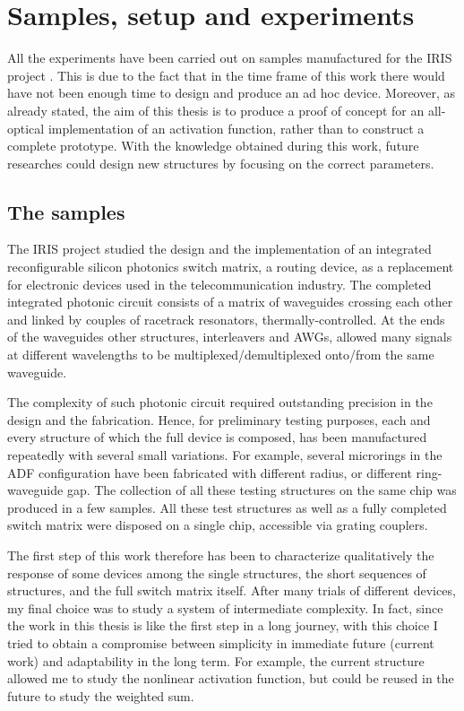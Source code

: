 \chapter{Samples, setup and experiments}
\label{ch:experiments}

All the experiments have been carried out on samples manufactured for the IRIS project \cite{testa2016design}.
This is due to the fact that in the time frame of this work there would have not been enough time to design and produce an ad hoc device.
Moreover, as already stated, the aim of this thesis is to produce a proof of concept for an all-optical implementation of an activation function, rather than to construct a complete prototype.
With the knowledge obtained during this work, future researches could design new structures by focusing on the correct parameters.

\section{The samples}
The IRIS project studied the design and the implementation of an integrated reconfigurable silicon photonics switch matrix, a routing device, as a replacement for electronic devices used in the telecommunication industry.
The completed integrated photonic circuit consists of a matrix of waveguides crossing each other and linked by couples of racetrack resonators, thermally-controlled.
At the ends of the waveguides other structures, interleavers and \acsp{AWG}, allowed many signals at different wavelengths to be multiplexed/demultiplexed onto/from the same waveguide.

The complexity of such photonic circuit required outstanding precision in the design and the fabrication.
Hence, for preliminary testing purposes, each and every structure of which the full device is composed, has been manufactured repeatedly with several small variations.
For example, several microrings in the \ac{ADF} configuration have been fabricated with different radius, or different ring-waveguide gap.
The collection of all these testing structures on the same chip was produced in a few samples.
All these test structures as well as a fully completed switch matrix were disposed on a single chip, accessible via grating couplers.

The first step of this work therefore has been to characterize qualitatively the response of some devices among the single structures, the short sequences of structures, and the full switch matrix itself.
After many trials of different devices, my final choice was to study a system of intermediate complexity.
In fact, since the work in this thesis is like the first step in a long journey, with this choice I tried to obtain a compromise between simplicity in immediate future (current work) and adaptability in the long term.
For example, the current structure allowed me to study the nonlinear activation function, but could be reused in the future to study the weighted sum.

